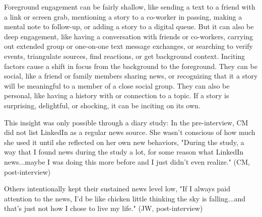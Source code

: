 \documentclass[sigchi]{acmart}
\begin{document}
Foreground engagement can be fairly shallow, like sending a text to a friend with a link or screen grab, mentioning a story to a co-worker in passing, making a mental note to follow-up, or adding a story to a digital queue. But it can also be deep engagement, like having a conversation with friends or co-workers, carrying out extended group or one-on-one text message exchanges, or searching to verify events, triangulate sources, find reactions, or get background context. Inciting factors cause a shift in focus from the background to the foreground. They can be social, like a friend or family members sharing news, or recognizing that it a story will be meaningful to a member of a close social group. They can also be personal, like having a history with or connection to a topic. If a story is surprising, delightful, or shocking, it can be inciting on its own.


This insight was only possible through a diary study: In the pre-interview, CM did not list LinkedIn as a regular news source. She wasn't conscious of how much she used it until she reflected on her own new behaviors, "During the study, a way that I found news during the study a lot, for some reason what LinkedIn news...maybe I was doing this more before and I just didn't even realize." (CM, post-interview) 

Others intentionally kept their sustained news level low, "If I always paid attention to the news, I’d be like chicken little thinking the sky is falling...and that’s just not how I chose to live my life." (JW, post-interview) 



\end{document}
